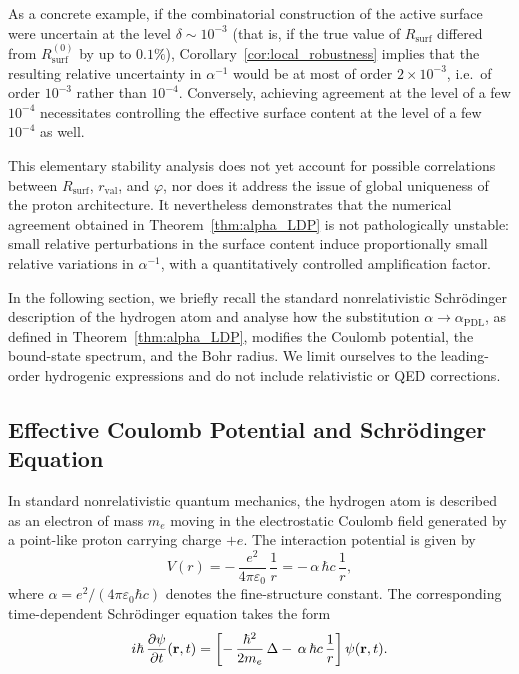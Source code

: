 \documentclass[11pt,a4paper]{article}
\theoremstyle{plain}
\theoremstyle{definition}
\theoremstyle{remark}
\begin{document}
As a concrete example, if the combinatorial construction of the active surface were uncertain at the level \(\delta \sim 10^{-3}\) (that is, if the true value of \(R_{\mathrm{surf}}\) differed from \(R_{\mathrm{surf}}^{(0)}\) by up to \(0.1\%\)), Corollary~\ref{cor:local_robustness} implies that the resulting relative uncertainty in \(\alpha^{-1}\) would be at most of order \(2\times 10^{-3}\), i.e.\ of order \(10^{-3}\) rather than \(10^{-4}\). Conversely, achieving agreement at the level of a few \(10^{-4}\) necessitates controlling the effective surface content at the level of a few \(10^{-4}\) as well.

This elementary stability analysis does not yet account for possible correlations between \(R_{\mathrm{surf}}\), \(r_{\mathrm{val}}\), and \(\varphi\), nor does it address the issue of global uniqueness of the proton architecture. It nevertheless demonstrates that the numerical agreement obtained in Theorem~\ref{thm:alpha_LDP} is not pathologically unstable: small relative perturbations in the surface content induce proportionally small relative variations in \(\alpha^{-1}\), with a quantitatively controlled amplification factor.

In the following section, we briefly recall the standard nonrelativistic Schrödinger description of the hydrogen atom and analyse how the substitution \(\alpha \to \alpha_{\mathrm{PDL}}\), as defined in Theorem~\ref{thm:alpha_LDP}, modifies the Coulomb potential, the bound-state spectrum, and the Bohr radius. We limit ourselves to the leading-order hydrogenic expressions and do not include relativistic or QED corrections.

\subsection{Effective Coulomb Potential and Schrödinger Equation}

In standard nonrelativistic quantum mechanics, the hydrogen atom is described as an electron of mass \(m_e\) moving in the electrostatic Coulomb field generated by a point-like proton carrying charge \(+e\). The interaction potential is given by
\[
  V(r) = -\,\frac{e^2}{4\pi \varepsilon_0}\,\frac{1}{r}
       = -\,\alpha\,\hbar c\,\frac{1}{r},
\]
where \(\alpha = e^2/(4\pi\varepsilon_0\hbar c)\) denotes the fine-structure constant. The corresponding time-dependent Schrödinger equation takes the form
\[
  i\hbar\,\frac{\partial \psi}{\partial t}(\vb{r},t)
  =
  \left[
    -\,\frac{\hbar^2}{2m_e}\,\Delta
    -\,\alpha\,\hbar c\,\frac{1}{r}
  \right] \psi(\vb{r},t).
\]
\end{document}
